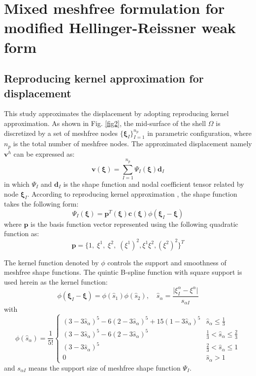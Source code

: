 \section{Mixed meshfree formulation for modified Hellinger-Reissner weak form}\label{mixed}
\subsection{Reproducing kernel approximation for displacement}
This study approximates the displacement by adopting reproducing kernel approximation. As shown in Fig. \ref{fig2}, the mid-surface of the shell $\Omega$ is discretized by a set of meshfree nodes $\{\boldsymbol \xi_I\}_{I=1}^{n_p}$ in parametric configuration, where $n_p$ is the total number of meshfree nodes. The approximated displacement namely $\boldsymbol v^h$ can be expressed as:
\begin{equation}\label{approxv}
\boldsymbol v(\boldsymbol \xi) = \sum_{I=1}^{n_p} \Psi_I(\boldsymbol \xi) \boldsymbol d_I
\end{equation}
in which $\Psi_I$ and $\boldsymbol d_I$ is the shape function and nodal coefficient tensor related by node $\boldsymbol \xi_I$. According to reproducing kernel approximation \cite{liu1995}, the shape function takes the following form:
\begin{equation}
\Psi_I(\boldsymbol \xi) = \boldsymbol p^T(\boldsymbol \xi) \boldsymbol c(\boldsymbol \xi) \phi(\boldsymbol \xi_I - \boldsymbol \xi)
\end{equation}
where $\boldsymbol p$ is the basis function vector represented using the following quadratic function as:
\begin{equation}
        \boldsymbol p = \{1,\;\xi^1,\;\xi^2,\;(\xi^1)^2,\xi^1\xi^2,(\xi^2)^2\}^T
\end{equation}

The kernel function denoted by $\phi$ controls the support and smoothness of meshfree shape functions. The quintic B-spline function with square support is used herein as the kernel function:
\begin{equation}
\phi(\boldsymbol \xi_I - \boldsymbol \xi) = \phi(\hat s_1)\phi(\hat s_2), \quad \hat s_\alpha = \frac{\vert \xi^\alpha_I - \xi^\alpha\vert}{s_{\alpha I}}
\end{equation}
with
\begin{equation}
\phi(\hat s_\alpha) = \frac{1}{5!}\begin{cases}
(3-3\hat s_\alpha)^5 - 6(2-3\hat s_\alpha)^5 + 15(1-3\hat s_\alpha)^5 & \hat s_\alpha \le \frac{1}{3} \\
(3-3\hat s_\alpha)^5 - 6(2-3\hat s_\alpha)^5 & \frac{1}{3}<\hat s_\alpha \le \frac{2}{3} \\
(3-3\hat s_\alpha)^5 & \frac{2}{3}<\hat s_\alpha \le 1 \\
0 & \hat s_\alpha >1
\end{cases}
\end{equation}
and $s_{\alpha I}$ means the support size of meshfree shape function $\Psi_I$.

